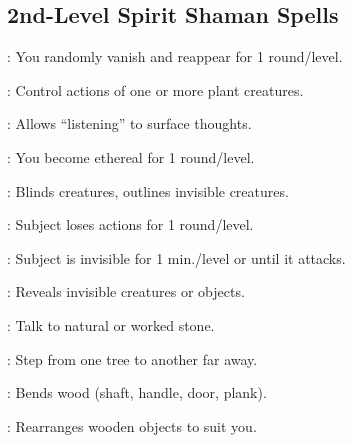 \begin{multicols}{2}
\subsection{2nd-Level Spirit Shaman Spells}
\begin{description*}
\item[\linkspell{Blink}:] You randomly vanish and reappear for 1 round/level.
\item[\linkspell{Control Plants}:] Control actions of one or more plant creatures.
\item[\linkspell{Detect Thoughts}:] Allows “listening” to surface thoughts.
\item[\linkspell{Ethereal Jaunt}:] You become ethereal for 1 round/level.
\item[\linkspell{Glitterdust}:] Blinds creatures, outlines invisible creatures. 
\item[\linkspell{Hideous Laughter}:] Subject loses actions for 1 round/level.
\item[\linkspell{Invisibility}:] Subject is invisible for 1 min./level or until it attacks.
\item[\linkspell{See Invisibility}:] Reveals invisible creatures or objects.
\item[\linkspell{Stone Tell}:] Talk to natural or worked stone.
\item[\linkspell{Treestride}:] Step from one tree to another far away.
\item[\linkspell{Warp Wood}:] Bends wood (shaft, handle, door, plank).
\item[\linkspell{Wood Shape}:] Rearranges wooden objects to suit you. 
\end{description*}


\end{multicols}
